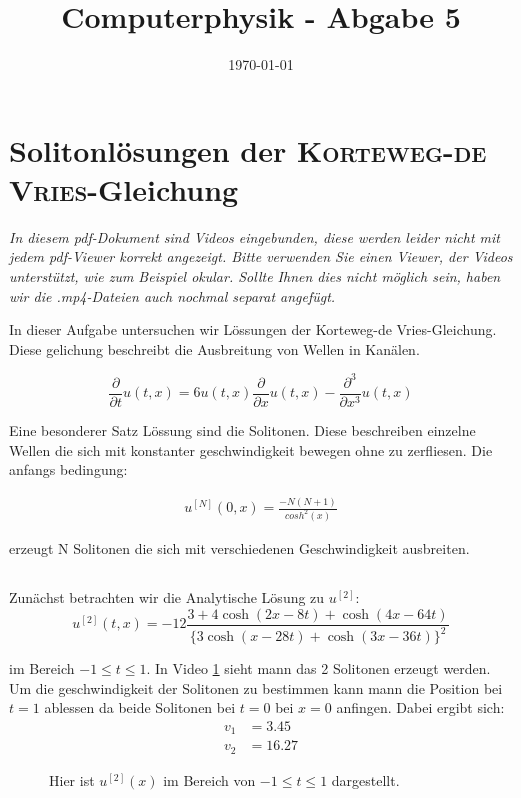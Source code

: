 \documentclass[ngerman]{scrartcl}
\title{Computerphysik - Abgabe 5}
\date{\today}
\begin{document}
	\setcounter{section}{9}
	\thispagestyle{fancy}
	\renewcommand{\thesection}{H.\arabic{section}:}
	\renewcommand{\thesubsection}{H\arabic{section}.\arabic{subsection}}
	
\section{Solitonlösungen der \textsc{Korteweg-de Vries}-Gleichung}

\textit{In diesem pdf-Dokument sind Videos eingebunden, diese werden leider nicht mit jedem pdf-Viewer korrekt angezeigt. Bitte verwenden Sie einen Viewer, der Videos unterstützt, wie zum Beispiel \emph{okular}. Sollte Ihnen dies nicht möglich sein, haben wir die .mp4-Dateien auch nochmal separat angefügt.}

In dieser Aufgabe untersuchen wir L\"ossungen der Korteweg-de Vries-Gleichung.
Diese gelichung beschreibt die Ausbreitung von Wellen in Kan\"alen.

\begin{equation*}
\frac{\partial}{\partial t} u(t, x)=6 u(t, x) \frac{\partial}{\partial x} u(t, x)-\frac{\partial^{3}}{\partial x^{3}} u(t, x)
\end{equation*}

Eine besonderer Satz L\"ossung sind die Solitonen.
Diese beschreiben einzelne Wellen die sich mit konstanter geschwindigkeit bewegen ohne zu zerfliesen.
Die anfangs bedingung:

\begin{align}
	u^{[N]}(0,x)=\frac{-N(N+1)}{cosh^2(x)}
\end{align}

erzeugt N Solitonen die sich mit verschiedenen Geschwindigkeit ausbreiten.
\subsection{}

Zunächst betrachten wir die Analytische Lösung zu $u^{[2]}$:
\begin{equation*}
u^{[2]}(t, x)=-12 \frac{3+4 \cosh (2 x-8 t)+\cosh (4 x-64 t)}{\{3 \cosh (x-28 t)+\cosh (3 x-36 t)\}^{2}}
\end{equation*}

im Bereich $-1 \le t \le 1$. 
In Video \ref{vid:H10.1} sieht mann das 2 Solitonen erzeugt werden.
Um die geschwindigkeit der Solitonen zu bestimmen kann mann die Position bei $t=1$ ablessen
da beide Solitonen bei $t=0$ bei $x=0$ anfingen. Dabei ergibt sich:
\begin{align*}
	v_1&=3.45\\
	v_2&=16.27
\end{align*}
\begin{figure}[htbp]
	\centering
	\caption[2 Solitonen]{Hier ist $u^{[2]}(x)$ im Bereich von $-1\le t \le 1$ dargestellt.}
	\label{vid:H10.1}
\end{figure}
\end{document}
